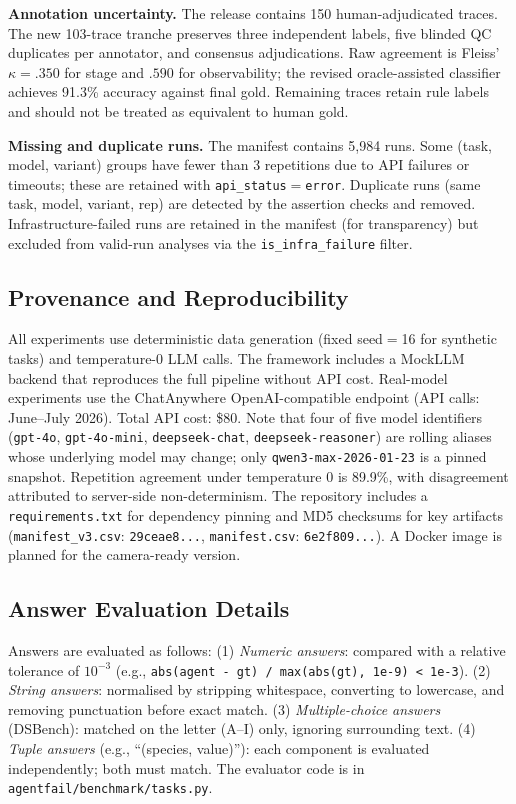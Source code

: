 \textbf{Annotation uncertainty.} The release contains 150 human-adjudicated traces. The new 103-trace tranche preserves three independent labels, five blinded QC duplicates per annotator, and consensus adjudications. Raw agreement is Fleiss' $\kappa=.350$ for stage and $.590$ for observability; the revised oracle-assisted classifier achieves 91.3\% accuracy against final gold. Remaining traces retain rule labels and should not be treated as equivalent to human gold.

\textbf{Missing and duplicate runs.} The manifest contains 5{,}984 runs. Some (task, model, variant) groups have fewer than 3 repetitions due to API failures or timeouts; these are retained with \texttt{api\_status}$=$\texttt{error}. Duplicate runs (same task, model, variant, rep) are detected by the assertion checks and removed. Infrastructure-failed runs are retained in the manifest (for transparency) but excluded from valid-run analyses via the \texttt{is\_infra\_failure} filter.

\subsection{Provenance and Reproducibility}

All experiments use deterministic data generation (fixed seed$=$16 for synthetic tasks) and temperature-0 LLM calls. The framework includes a MockLLM backend that reproduces the full pipeline without API cost. Real-model experiments use the ChatAnywhere OpenAI-compatible endpoint (API calls: June--July 2026). Total API cost: \$80. Note that four of five model identifiers (\texttt{gpt-4o}, \texttt{gpt-4o-mini}, \texttt{deepseek-chat}, \texttt{deepseek-reasoner}) are rolling aliases whose underlying model may change; only \texttt{qwen3-max-2026-01-23} is a pinned snapshot. Repetition agreement under temperature 0 is 89.9\%, with disagreement attributed to server-side non-determinism. The repository includes a \texttt{requirements.txt} for dependency pinning and MD5 checksums for key artifacts (\texttt{manifest\_v3.csv}: \texttt{29ceae8...}, \texttt{manifest.csv}: \texttt{6e2f809...}). A Docker image is planned for the camera-ready version.

\subsection{Answer Evaluation Details}

Answers are evaluated as follows: (1) \emph{Numeric answers}: compared with a relative tolerance of $10^{-3}$ (e.g., \texttt{abs(agent - gt) / max(abs(gt), 1e-9) < 1e-3}). (2) \emph{String answers}: normalised by stripping whitespace, converting to lowercase, and removing punctuation before exact match. (3) \emph{Multiple-choice answers} (DSBench): matched on the letter (A--I) only, ignoring surrounding text. (4) \emph{Tuple answers} (e.g., ``(species, value)''): each component is evaluated independently; both must match. The evaluator code is in \texttt{agentfail/benchmark/tasks.py}.

